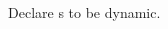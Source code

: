 \begin{LIST}{1cm}
\begin{LIST}{.5cm}
    {
      Declare s to be dynamic.
    }

  \end{LIST}
\end{LIST}





